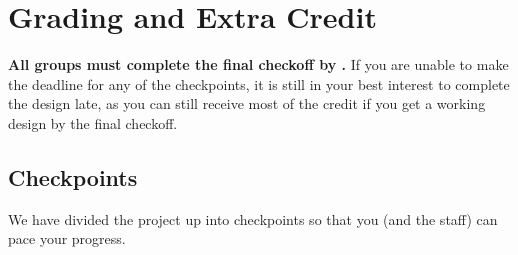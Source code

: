 \documentclass[11pt]{article}
\begin{document}
%
%
%

\pagebreak

\section{Grading and Extra Credit}
\textbf{All groups must complete the final checkoff by \finalCheckoffDueDate.}
If you are unable to make the deadline for any of the checkpoints, it is still in your best interest to complete the design late, as you can still receive most of the credit if you get a working design by the final checkoff.

\subsection{Checkpoints}
\label{checkoff}
We have divided the project up into checkpoints so that you (and the staff) can pace your progress.
\end{document}
